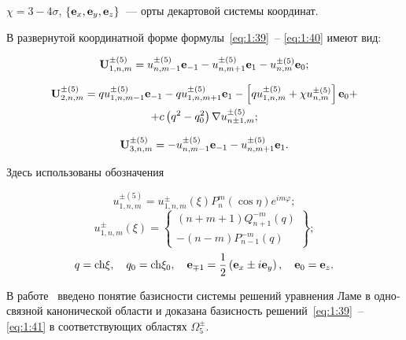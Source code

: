 \begin{russian}
\noindent $\chi  = 3 - 4\sigma $, $\left\{ {{{\bf{e}}_x},{{\bf{e}}_y},{{\bf{e}}_z}} \right\}$~--- орты декартовой системы координат.

В развернутой координатной форме формулы~\eqref{eq:1:39}~-- \eqref{eq:1:40} имеют вид:

\begin{equation}\label{eq:1:42}
{\bf{U}}_{1,n,m}^{ \pm (5)} = u_{n,m - 1}^{ \pm (5)}{{\bf{e}}_{ - 1}} - u_{n,m + 1}^{ \pm (5)}{{\bf{e}}_1} - u_{n,m}^{ \pm (5)}{{\bf{e}}_0};
\end{equation}

\begin{multline}\label{eq:1:43}
{\bf{U}}_{2,n,m}^{ \pm (5)} = qu_{1,n,m - 1}^{ \pm (5)}{{\bf{e}}_{ - 1}} - qu_{1,n,m + 1}^{ \pm (5)}{{\bf{e}}_1} - \left[ {qu_{1,n,m}^{ \pm (5)} + \chi u_{n,m}^{ \pm (5)}} \right]{{\bf{e}}_0} + \\
+ c\left( {{q^2} - q_0^2} \right)\nabla u_{n \pm 1,m}^{ \pm (5)};
\end{multline}

\begin{equation}\label{eq:1:44}
{\bf{U}}_{3,n,m}^{ \pm (5)} =  - u_{n,m - 1}^{ \pm (5)}{{\bf{e}}_{ - 1}} - u_{n,m + 1}^{ \pm (5)}{{\bf{e}}_1}.
\end{equation}

Здесь использованы обозначения

\begin{equation*}
u_{1,n,m}^{ \pm (5)} = u_{1,n,m}^ \pm (\xi )P_n^m(\cos \eta ){e^{im\varphi }};
\end{equation*}
\begin{equation*}
u_{1,n,m}^ \pm (\xi ) = \left\{ \begin{array}{l}
(n + m + 1)Q_{n + 1}^{ - m}(q)\\
 - (n - m)P_{n - 1}^{ - m}(q)
\end{array} \right\};
\end{equation*}
\begin{equation}\label{eq:1:45}
q = {\mathop{\rm ch}\nolimits} \xi ,\quad {q_0} = {\mathop{\rm ch}\nolimits} {\xi _0},\quad {{\bf{e}}_{ \mp 1}} = \frac{1}{2}\left( {{{\bf{e}}_x} \pm i{{\bf{e}}_y}} \right),\quad {{\bf{e}}_0} = {{\bf{e}}_z}.
\end{equation}

В работе~\cite{Nikolaev1998} введено понятие базисности системы решений уравнения Ламе в односвязной канонической области и доказана базисность решений~\eqref{eq:1:39}~-- \eqref{eq:1:41} в соответствующих областях $\Omega _5^ \pm $.{\sloppy\par}


\end{russian}
